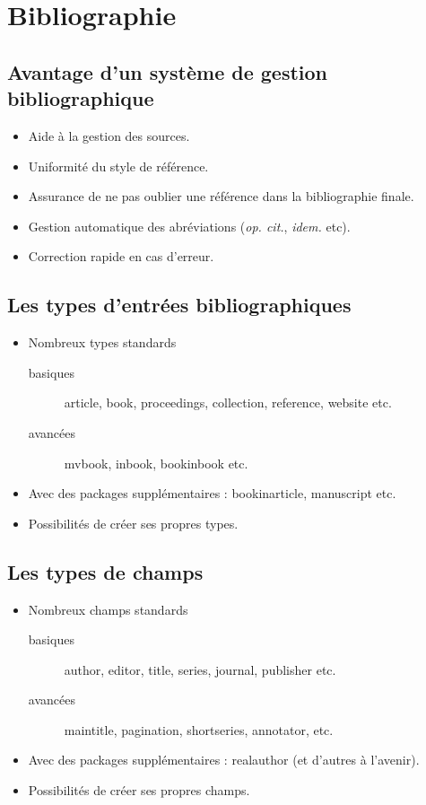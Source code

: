 \section{Bibliographie}

\subsection{Avantage d'un système de gestion bibliographique}
\begin{slide}
  \begin{itemize}
    \item Aide à la gestion des sources.
    \item Uniformité du style de référence.
    \item Assurance de ne pas oublier une référence dans la bibliographie finale.
    \item Gestion automatique des abréviations (\emph{op. cit.}, \emph{idem.} etc).
    \item Correction rapide en cas d'erreur.
  \end{itemize}
\end{slide}
\subsection{Les types d'entrées bibliographiques}
\begin{slide}
  \begin{itemize}
    \item Nombreux types standards
      \begin{description}
	\item[basiques] article, book, proceedings, collection, reference, website etc.
	\item[avancées] mvbook, inbook, bookinbook etc.
      \end{description}
    \item Avec des packages supplémentaires : bookinarticle, manuscript etc.
    \item Possibilités de créer ses propres types. 
  \end{itemize}
\end{slide}
\subsection{Les types de champs}
\begin{slide}
  \begin{itemize}
    \item Nombreux champs standards
      \begin{description}
	\item[basiques] author, editor, title, series, journal,  publisher etc.
	\item[avancées] maintitle, pagination, shortseries,  annotator, etc.
      \end{description}
    \item Avec des packages supplémentaires : realauthor (et d'autres à l'avenir).
    \item Possibilités de créer ses propres champs.
  \end{itemize}
\end{slide}


